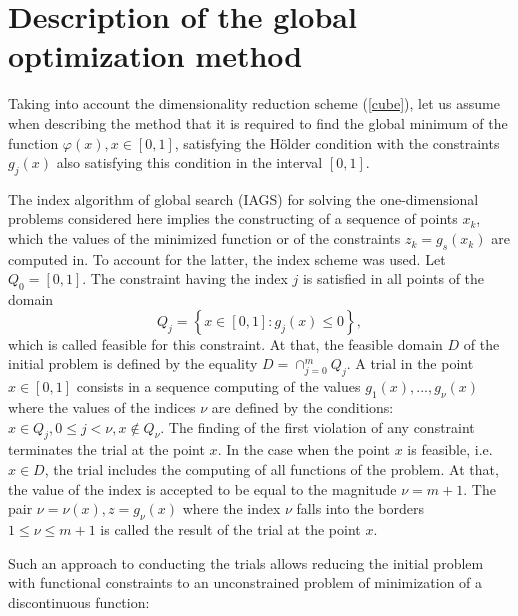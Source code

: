 \documentclass[runningheads]{llncs}
\begin{document}
\section{Description of the global optimization method}
\label{sec:method}

Taking into account the dimensionality reduction scheme (\ref{cube}), let us assume when
describing the method that it is required to find the global minimum of the function \(\varphi(x),
x\in[0,1]\), satisfying the H\"{o}lder condition with the constraints \(g_j(x)\) also satisfying this
condition in the interval \([0,1]\).

The index algorithm of global search (IAGS) for solving the one-dimensional problems
considered here implies the constructing of a sequence of points
\(x_k\), which the values of the minimized function or of the constraints \(z_k = g_s(x_k)\) are
computed in.
To account for the latter, the index scheme \cite{Strongin2000} was used.
Let \(Q_0=[0,1]\). The constraint having the index \(j\) is satisfied in all points of the domain
\begin{displaymath}
  Q_j=\left\{x\in [0,1]:g_j(x)\leq 0\right\},
\end{displaymath}
which is called feasible for this constraint.
At that, the feasible domain \(D\) of the initial problem is defined by the equality
 \(D=\cap _{j=0}^{m}Q_{j}\).
A trial in the point \(x\in [0,1]\) consists in a sequence computing of the values
\(g_{1}(x),...,g_{\nu }(x)\)
where the values of the indices \(\nu\) are defined by the conditions:
\(x\in Q_{j},0\leqslant j<\nu ,x\notin Q_{\nu }\).
The finding of the first violation of any constraint terminates the trial at the point \(x\).
In the case when the point \(x\) is feasible, i.e. \(x\in D\), the trial includes the computing of all
functions of the problem.
At that, the value of the index is accepted to be equal to the magnitude \(\nu =m+1\).
The pair \(\nu =\nu (x), z=g_{\nu }(x)\) where the index \(\nu\) falls into the borders \(1\leqslant
\nu \leqslant m+1\) is called the result of the trial at the point \(x\).

Such an approach to conducting the trials allows reducing the initial problem with functional
constraints to an unconstrained problem of minimization of a discontinuous function:
\end{document}
